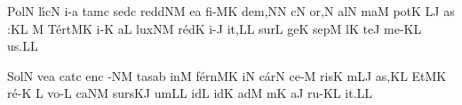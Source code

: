 \initiumgregorianum
{}%
\sgn Pol\punctum N\egn
\sgn l{\'\i}c\punctum N\egn
\sgn {}i-\punctum a\egn
\sgn tam\punctum c\egn
\spatium
\sgn sed\punctum c\egn
\spatium
\sgn r{e}{dd}\clivis NM\egn
\sgn {}e{}\punctum a\egn
\spatium
\sgn f{i}-\clivis MK\egn
\sgn de{m,}\punctum N\augmentum N\egn
\spatium
\divisiominima
\spatium
{}c\punctum N\egn
\sgn {}o{r,}\punctum N\egn
\spatium
\sgn {}al\punctum N\egn
\sgn ma{}\punctum M\egn
\spatium
\sgn pot\punctum K\egn
{}\clivis LJ\egn
\sgn {}a{s :}\punctum K\augmentum L\egn
\spatium
\divisiominor
\spatium
\custos M
\lineaproxima
\sgn T{\'e}{rt}\clivis MK\egn
\sgn {}i-\punctum K\egn
\sgn {}a{}\punctum L\egn
\spatium
\sgn lux\clivis NM\egn
\spatium
\sgn r{\'e}d\punctum K\egn
\sgn {}i-\punctum J\egn
\sgn {}i{t,}\punctum L\augmentum L\egn
\spatium
\divisiominima
\spatium
\sgn s{u}r\punctum L\egn
\sgn ge{}\punctum K\egn
\spatium
\sgn sep\punctum M\egn
{}l\punctum K\egn
\sgn te{}\punctum J\egn
\spatium
\sgn m{e}-\pes KL\egn
\sgn {}u{s.}\punctum L\augmentum L\egn
\Finisgregoriana



\smallskip

\initiumgregorianum
{}%
\sgn S{o}l\punctum N\egn
\sgn ve{}\punctum a\egn
\spatium
\sgn cat\punctum c\egn
\sgn {}en\punctum c\egn
{}-\clivis NM\egn
\sgn tas\punctum a\augmentum b\egn
\spatium
\divisiominima
\spatium
\sgn {}in\punctum M\egn
\sgn f{\'e}{rn}\clivis MK\egn
\sgn {}i{}\punctum N\egn
\spatium
\sgn c{\'a}r\punctum N\egn
\sgn ce-\punctum M\egn
\sgn ris\punctum K\egn
\spatium
{}m\clivis LJ\egn
{}a{s,}\punctum K\augmentum L\egn
\spatium
\divisiominor
\spatium
\sgn {}Et\clivis MK\egn
\spatium
\sgn r{\'e}-\punctum K\egn
\custos L
\lineaproxima
\sgn vo-\punctum L\egn
\sgn ca{}\clivis NM\egn
\spatium
\sgn s{u}{rs}\clivis KJ\egn
\sgn {}um\punctum L\augmentum L\egn
\spatium
\divisiominima
\spatium
{}id\punctum L\egn
{}id\punctum K\egn
\spatium
\sgn {}ad\punctum M\egn
\spatium
{}m\punctum K\egn
\sgn {}a{}\punctum J\egn
\spatium
\sgn r{u}-\pes KL\egn
\sgn {}i{t.}\punctum L\augmentum L\egn
\Finisgregoriana



\smallskip

